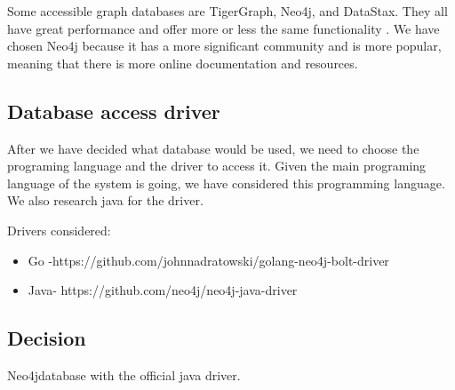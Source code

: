 \indent
\indent
Some accessible graph databases are TigerGraph, Neo4j, and DataStax. They all have great performance and offer more or less the same functionality \cite{gdbcomparison}. We have chosen Neo4j because it has a more significant community and is more popular, meaning that there is more online documentation and resources.

\subsection{Database access driver}

\indent
\indent
After we have decided what database would be used, we need to choose the programing language and the driver to access it.
Given the main programing language of the system is going, we have considered this programming language. We also research java for the driver.

Drivers considered:
\begin{itemize}
	\item Go -https://github.com/johnnadratowski/golang-neo4j-bolt-driver
	\item Java- https://github.com/neo4j/neo4j-java-driver
\end{itemize}

\subsection{Decision}

\indent
\indent
Neo4jdatabase with the official java driver.
